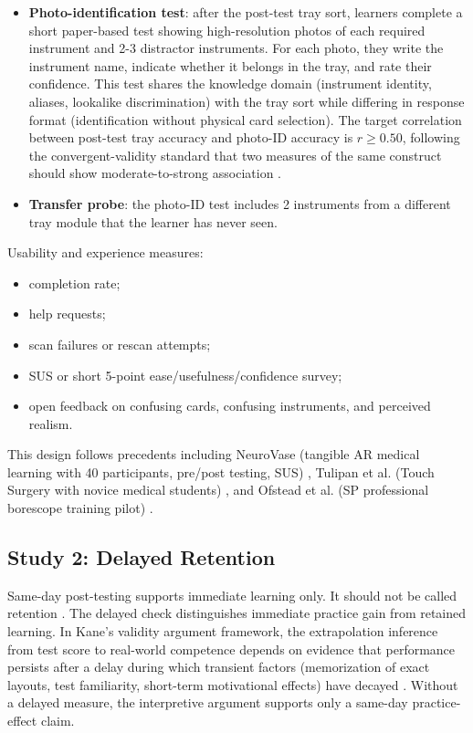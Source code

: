 \documentclass[10pt,a4paper]{article}
\begin{document}
\begin{itemize}
  \item \textbf{Photo-identification test}: after the post-test tray sort, learners
  complete a short paper-based test showing high-resolution photos of each
  required instrument and 2-3 distractor instruments. For each photo, they write
  the instrument name, indicate whether it belongs in the tray, and rate their
  confidence. This test shares the knowledge domain (instrument identity, aliases,
  lookalike discrimination) with the tray sort while differing in response format
  (identification without physical card selection). The target correlation
  between post-test tray accuracy and photo-ID accuracy is $r \ge 0.50$, following
  the convergent-validity standard that two measures of the same construct should
  show moderate-to-strong association \cite{messick-validity-1989, cook-beckman-validity-2006, downing-validity-2003}.
  \item \textbf{Transfer probe}: the photo-ID test includes 2 instruments from a
  different tray module that the learner has never seen.
\end{itemize}
Usability and experience measures:
\begin{itemize}
  \item completion rate;
  \item help requests;
  \item scan failures or rescan attempts;
  \item SUS or short 5-point ease/usefulness/confidence survey;
  \item open feedback on confusing cards, confusing instruments, and perceived realism.
\end{itemize}
This design follows precedents including NeuroVase (tangible AR medical learning with 40 participants, pre/post testing, SUS)
\cite{jahani-et-al-2026-neurovase}, Tulipan et al. (Touch Surgery with novice medical students)
\cite{tulipan-et-al-2019}, and Ofstead et al. (SP professional borescope training pilot)
\cite{ofstead-et-al-2023}.

\subsection{Study 2: Delayed Retention}
\label{sec:study-2}

Same-day post-testing supports immediate learning only. It should not be called
retention \cite{bell-et-al-2008}. The delayed check distinguishes immediate
practice gain from retained learning. In Kane's validity argument framework, the
extrapolation inference from test score to real-world competence depends on
evidence that performance persists after a delay during which transient factors
(memorization of exact layouts, test familiarity, short-term motivational
effects) have decayed \cite{kane-validity-2013}. Without a delayed measure, the
interpretive argument supports only a same-day practice-effect claim.
\end{document}
